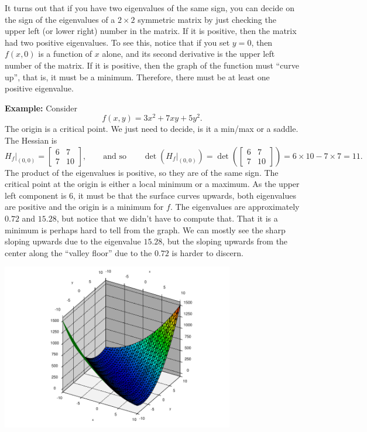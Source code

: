 \documentclass[12pt]{article}
\begin{document}
It turns out that if you have two eigenvalues of the same sign, you can
decide on the sign of the eigenvalues of a $2 \times 2$ symmetric matrix by just
checking the upper left (or lower right) number in the matrix.  If it is
positive, then the matrix had two positive eigenvalues.  To see this,
notice that if you set $y=0$, then $f(x,0)$ is a
function of $x$ alone, and its second derivative is the upper left number of
the matrix.  If it is positive, then the graph of the function must ``curve
up'', that is, it must be a minimum.  Therefore, there must be at least one
positive eigenvalue.

\bigskip

\pagebreak[2]
\textbf{Example:}  Consider
$$
f(x,y) = 3 x^2 + 7xy  + 5y^2 .
$$
The origin is a critical point.
We just need to decide, is it a min/max or a
saddle.
The Hessian is
$$
H_f \big|_{(0,0)} =
\begin{bmatrix}
6 & 7 \\
7 & 10
\end{bmatrix}
,
\qquad
\text{and so}
\qquad
\det(H_f\big|_{(0,0)}) = 
\det \left(
\begin{bmatrix}
6 & 7 \\
7 & 10
\end{bmatrix}
\right)
=
6 \times 10 - 7 \times 7 = 11 .
$$
The product of the eigenvalues is positive, so they are of the same sign.
The critical point at the origin is either a local minimum or a maximum.
As the upper left component is 6, it must be that the surface curves
upwards, both eigenvalues are positive and the origin is a minimum for $f$.
The eigenvalues are approximately $0.72$ and $15.28$, but notice
that we didn't have to compute that.  That it is a minimum is perhaps
hard to tell from the graph.  We can mostly see the sharp sloping upwards
due to the eigenvalue $15.28$, but the sloping upwards from the center along
the ``valley floor'' due to the $0.72$ is harder to discern.
\begin{center}
\includegraphics[width=4.0in]{all-upwards.pdf}
\end{center}
\end{document}
